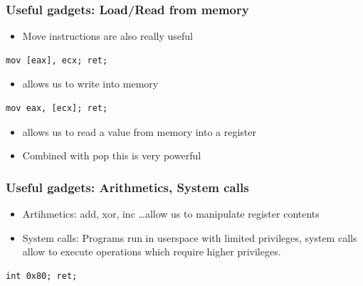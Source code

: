 \documentclass[11pt]{beamer}
\begin{document}
\begin{frame}[fragile]
    \frametitle{Useful gadgets: Load/Read from memory}
    \begin{itemize}
        \item Move instructions are also really useful
    \end{itemize}
\begin{lstlisting}[style=result]
mov [eax], ecx; ret;
\end{lstlisting}
    \begin{itemize}
        \item allows us to write into memory
    \end{itemize}
\begin{lstlisting}[style=result]
mov eax, [ecx]; ret;
\end{lstlisting}
    \begin{itemize}
        \item allows us to read a value from memory into a register
        \item Combined with pop this is very powerful
    \end{itemize}
\end{frame}

\begin{frame}[fragile]
    \frametitle{Useful gadgets: Arithmetics, System calls}
    \begin{itemize}
        \item Artihmetics: add, xor, inc \ldots allow us to manipulate register contents
        \item System calls: Programs run in userspace with limited privileges, system calls allow to execute operations which require higher privileges.
    \end{itemize}
\begin{lstlisting}[style=result]
int 0x80; ret;
\end{lstlisting}
\end{frame}
\end{document}
